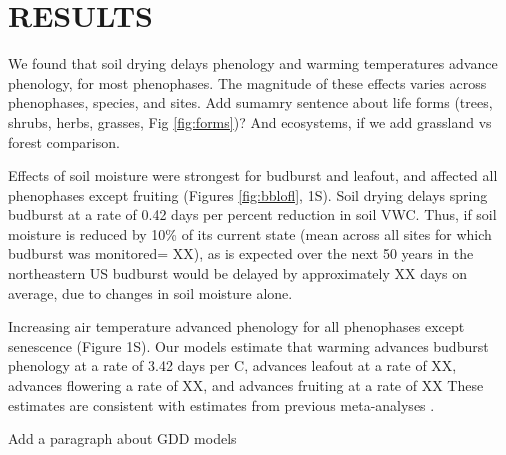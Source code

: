 \documentclass{article}
\begin{document}
\section* {RESULTS}
We found that soil drying delays phenology and warming temperatures advance phenology, for most phenophases. The magnitude of these effects varies across phenophases, species, and sites. Add sumamry sentence about life forms (trees, shrubs, herbs, grasses, Fig \ref{fig:forms})? And ecosystems, if we add grassland vs forest comparison.
\par Effects of soil moisture were strongest for budburst and leafout, and affected all phenophases except fruiting (Figures \ref{fig:bblofl}, 1S). Soil drying delays spring budburst at a rate of 0.42 days per percent reduction in soil VWC. Thus, if soil moisture is reduced by 10\% of its current state (mean across all sites for which budburst was monitored= XX), as is expected over the next 50 years in the northeastern US \citep{berg2017} budburst would be delayed by approximately XX days on average, due to changes in soil moisture alone.

\par  Increasing air temperature advanced phenology for all phenophases except senescence (Figure 1S). Our models estimate that warming advances budburst phenology at a rate of 3.42 days per \degree C, advances leafout at a rate of XX, advances flowering a rate of XX, and advances fruiting at a rate of XX These estimates are consistent with estimates from previous meta-analyses \citep{wolkovich2012}. 

\par  Add a paragraph about GDD models

\end{document}
